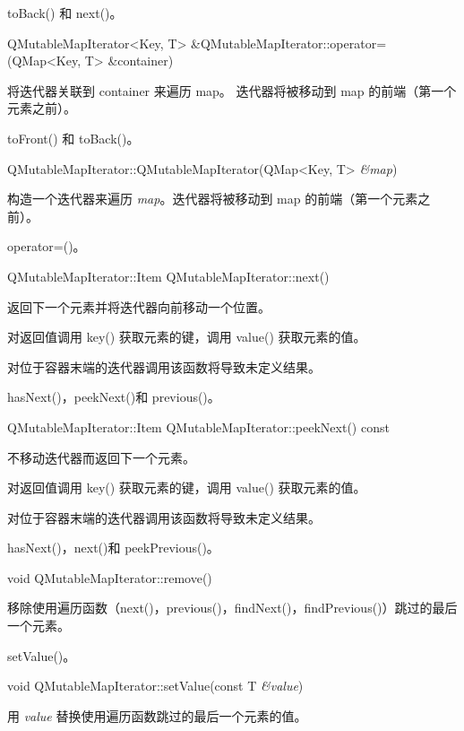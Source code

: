\begin{seeAlso}
toBack() 和 next()。
\end{seeAlso}

QMutableMapIterator<Key, T> \&QMutableMapIterator::operator=(QMap<Key, T> \&container)

将迭代器关联到 container 来遍历 map。
迭代器将被移动到 map 的前端（第一个元素之前）。

\begin{seeAlso}
toFront() 和 toBack()。
\end{seeAlso}

QMutableMapIterator::QMutableMapIterator(QMap<Key, T> \emph{\&map})

构造一个迭代器来遍历 \emph{map}。迭代器将被移动到 map 的前端（第一个元素之前）。

\begin{seeAlso}
operator=()。
\end{seeAlso}

QMutableMapIterator::Item QMutableMapIterator::next()

返回下一个元素并将迭代器向前移动一个位置。

对返回值调用 key() 获取元素的键，调用 value() 获取元素的值。

对位于容器末端的迭代器调用该函数将导致未定义结果。

\begin{seeAlso}
hasNext()，peekNext()和 previous()。
\end{seeAlso}

QMutableMapIterator::Item QMutableMapIterator::peekNext() const

不移动迭代器而返回下一个元素。

对返回值调用 key() 获取元素的键，调用 value() 获取元素的值。

对位于容器末端的迭代器调用该函数将导致未定义结果。

\begin{seeAlso}
hasNext()，next()和 peekPrevious()。
\end{seeAlso}

void QMutableMapIterator::remove()

移除使用遍历函数（next()，previous()，findNext()，findPrevious()）跳过的最后一个元素。

\begin{seeAlso}
setValue()。
\end{seeAlso}

void QMutableMapIterator::setValue(const T \emph{\&value})

用 \emph{value} 替换使用遍历函数跳过的最后一个元素的值。

